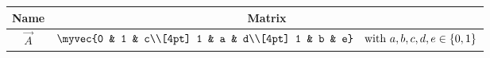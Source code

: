 \begin{tabular}{|c|c|}
\hline
\textbf{Name} & \textbf{Matrix} \\
\hline
$\vec{A}$ & $\displaystyle
\myvec{0 & 1 & c\\[4pt] 1 & a & d\\[4pt] 1 & b & e}
\quad\text{with } a,b,c,d,e\in\{0,1\}$
\\ \hline
\end{tabular}

